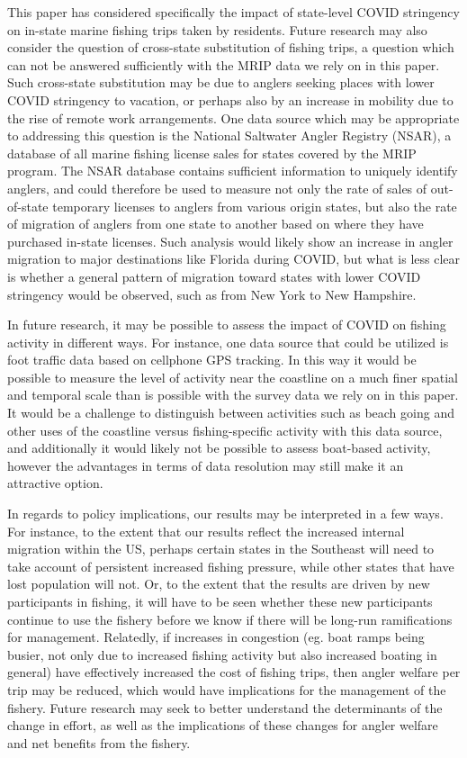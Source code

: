 \documentclass[12pt]{article}
\begin{document}
This paper has considered specifically the impact of state-level COVID
stringency on in-state marine fishing trips taken by residents. Future
research may also consider the question of cross-state substitution of
fishing trips, a question which can not be answered sufficiently with
the MRIP data we rely on in this paper. Such cross-state substitution
may be due to anglers seeking places with lower COVID stringency to
vacation, or perhaps also by an increase in mobility due to the rise of
remote work arrangements. One data source which may be appropriate to
addressing this question is the National Saltwater Angler Registry
(NSAR), a database of all marine fishing license sales for states
covered by the MRIP program. The NSAR database contains sufficient
information to uniquely identify anglers, and could therefore be used to
measure not only the rate of sales of out-of-state temporary licenses to
anglers from various origin states, but also the rate of migration of
anglers from one state to another based on where they have purchased
in-state licenses. Such analysis would likely show an increase in angler
migration to major destinations like Florida during COVID, but what is
less clear is whether a general pattern of migration toward states with
lower COVID stringency would be observed, such as from New York to New
Hampshire.

In future research, it may be possible to assess the impact of COVID on
fishing activity in different ways. For instance, one data source that
could be utilized is foot traffic data based on cellphone GPS tracking.
In this way it would be possible to measure the level of activity near
the coastline on a much finer spatial and temporal scale than is
possible with the survey data we rely on in this paper. It would be a
challenge to distinguish between activities such as beach going and
other uses of the coastline versus fishing-specific activity with this
data source, and additionally it would likely not be possible to assess
boat-based activity, however the advantages in terms of data resolution
may still make it an attractive option.

In regards to policy implications, our results may be interpreted in a
few ways. For instance, to the extent that our results reflect the
increased internal migration within the US, perhaps certain states in
the Southeast will need to take account of persistent increased fishing
pressure, while other states that have lost population will not. Or, to
the extent that the results are driven by new participants in fishing,
it will have to be seen whether these new participants continue to use
the fishery before we know if there will be long-run ramifications for
management. Relatedly, if increases in congestion (eg. boat ramps being
busier, not only due to increased fishing activity but also increased
boating in general) have effectively increased the cost of fishing
trips, then angler welfare per trip may be reduced, which would have
implications for the management of the fishery. Future research may seek
to better understand the determinants of the change in effort, as well
as the implications of these changes for angler welfare and net benefits
from the fishery.
\end{document}
